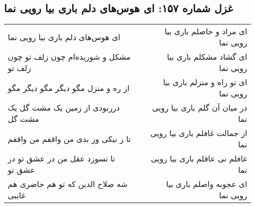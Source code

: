 \begin{center}
\section*{غزل شماره ۱۵۷: ای هوس‌های دلم باری بیا رویی نما}
\label{sec:0157}
\begin{longtable}{l p{0.5cm} r}
ای هوس‌های دلم باری بیا رویی نما
&&
ای مراد و حاصلم باری بیا رویی نما
\\
مشکل و شوریده‌ام چون زلف تو چون زلف تو
&&
ای گشاد مشکلم باری بیا رویی نما
\\
از ره و منزل مگو دیگر مگو دیگر مگو
&&
ای تو راه و منزلم باری بیا رویی نما
\\
درربودی از زمین یک مشت گل یک مشت گل
&&
در میان آن گلم باری بیا رویی نما
\\
تا ز نیکی وز بدی من واقفم من واقفم
&&
از جمالت غافلم باری بیا رویی نما
\\
تا نسوزد عقل من در عشق تو در عشق تو
&&
غافلم نی عاقلم باری بیا رویی نما
\\
شه صلاح الدین که تو هم حاضری هم غایبی
&&
ای عجوبه واصلم باری بیا رویی نما
\\
\end{longtable}
\end{center}
